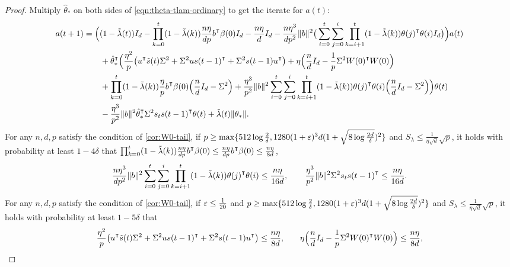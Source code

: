 \begin{proof}
    Multiply $\hat\theta_\ast$ on both sides of \cref{eqn:theta-tlam-ordinary} to get the iterate for $a(t)$:
    \begin{align}\label{eqn:a(t)lam-ordinary}
        \begin{split}
            a(t+1) & = \Big((1-\tlam(t))I_d -\prod_{k=0}^t(1-\tlam(k))\frac{n\eta}{dp}b\transpose\beta(0) I_d -\frac{n\eta}{d} I_d - \frac{n\eta^3}{dp^2}\|b\|^2\big(\sum_{i=0}^t\sum_{j=0}^i\prod_{k=i+1}^t(1-\tlam(k))\theta(j)\transpose \theta(i) I_d \big)\Big) a(t) \\
            & \qquad + \hat\theta_\ast\transpose\Big( \frac{\eta^2}{p}\big(u\transpose \tilde{s}(t) \Sigma^2 + \Sigma^2 u s(t-1)\transpose + \Sigma^2 s(t-1)u\transpose\big) + \eta\Big(\frac{n}{d}I_d - \frac{1}{p}\Sigma^2 W(0)\transpose W(0)\Big) \\
            & \qquad + \prod_{k=0}^t (1-\tilde\lambda(k))\frac{\eta}{p}b\transpose\beta(0) \Big(\frac{n}{d}I_d - \Sigma^2\Big) + \frac{\eta^3}{p^2}\|b\|^2\sum_{i=0}^t\sum_{j=0}^i\prod_{k=i+1}^t(1-\tilde\lambda(k))\theta(j)\transpose \theta(i) \Big(\frac{n}{d}I_d-\Sigma^2\Big) \Big)\theta(t) \\
            & \qquad -\frac{\eta^3}{p^2}\|b\|^2 \hat\theta_\ast\transpose \Sigma^2 s_{t}s(t-1)\transpose \theta(t) + \tlam(t)\|\theta_*\|.
        \end{split}
    \end{align}
    For any $n,d,p$ satisfy the condition of \cref{cor:W0-tail}, if $p\geq \max\{512\log\frac{2}{\delta},1280(1+\varepsilon)^3d(1+\sqrt{8\log\frac{2d}{\delta}})^2\}$ and $S_\lambda\leq \frac{1}{\eta\sqrt{d}}\sqrt{p}$, it holds with probability at least $1-4\delta$ that $\prod_{k=0}^t (1-\tlam(k))\frac{n\eta}{dp} b\transpose\beta(0) \leq \frac{n\eta}{dp}b\transpose\beta(0) \leq \frac{n\eta}{8d}$,
    \begin{align*}
        \frac{n\eta^3}{dp^2}\|b\|^2 \sum_{i=0}^t\sum_{j=0}^i\prod_{k=i+1}^t(1-\tlam(k))\theta(j)\transpose \theta(i) \leq \frac{n\eta}{16d}, \qquad
        \frac{\eta^3}{p^2}\|b\|^2 \Sigma^2 s_{t}s(t-1)\transpose \leq \frac{n\eta}{16d}.
    \end{align*}
    For any $n,d,p$ satisfy the condition of \cref{cor:W0-tail}, if $\varepsilon\leq \frac{1}{20}$ and $p\geq \max\{512\log\frac{2}{\delta},1280(1+\varepsilon)^3d(1+\sqrt{8\log\frac{2d}{\delta}})^2\}$ and $S_\lambda\leq \frac{1}{\eta\sqrt{d}}\sqrt{p}$, it holds with probability at least $1-5\delta$ that
    \begin{align*}
        \frac{\eta^2}{p}\big(u\transpose \tilde{s}(t) \Sigma^2 + \Sigma^2 u s(t-1)\transpose + \Sigma^2 s(t-1)u\transpose\big) \leq \frac{n\eta}{8d},& \qquad \eta\Big(\frac{n}{d}I_d - \frac{1}{p}\Sigma^2 W(0)\transpose W(0)\Big) \leq \frac{n\eta}{8d}, \\

\end{align*}
\end{proof}
